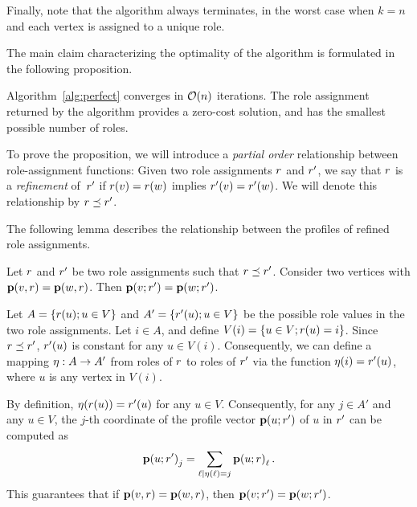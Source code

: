 Finally, note that the \algperfect algorithm always terminates, 
in the worst case when $k=n$ and each vertex is assigned to a unique role.

The main claim characterizing the optimality of the \algperfect algorithm
is formulated in the following proposition.

\begin{proposition}
\label{prop:perfectcorrect}
Algorithm~\ref{alg:perfect} converges in $\bigO{n}$ iterations. 
The role assignment returned by the algorithm  
provides a zero-cost solution, 
and has the smallest possible number of roles.
\end{proposition}

To prove the proposition, we will introduce a \emph{partial order} 
relationship between 
role-assignment functions:  
Given two role assignments $r$ and $r'$, we say that $r$ is a
\emph{refinement} of~$r'$ if $r(v) = r(w)$ implies $r'(v) =
r'(w)$. We will denote this relationship by $r \preceq r'$.

The following lemma describes the relationship between the profiles of refined role assignments.

\begin{lemma}
\label{lem:refineprofile}
Let $r$ and $r'$ be two role assignments such that $r \preceq r'$.
Consider two vertices %
with $\prof{v, \role} = \prof{w, \role}$. 
Then $\prof{v; \role'} = \prof{w; \role'}$.
\end{lemma}

\begin{IEEEproof}
Let $A = \left\{r(u); u \in V\right\}$ and $A' = \left\{r'(u); u \in V\right\}$ be the
possible role values in the two role assignments. 
Let $i \in A$, and define $V(i) = \left\{u \in V; r(u) = i\right\}$.
Since $r \preceq r'$, $r'(u)$ is constant for any $u \in V(i)$.
Consequently, we can define a mapping 
${\eta}:{A} \to {A'}$ 
from roles of $r$
to roles of $r'$ via the function
$\eta(i) = r'(u)$, where $u$ is any vertex in $V(i)$.

By definition, $\eta(r(u)) = r'(u)$ for any $u \in V$. 
Consequently,
for any $j \in A'$ and any $u \in V$, 
the $j$-th coordinate of the profile vector $\prof{u; \role'}$
of $u$ in $r'$ can be computed as  
\[
\prof{u; \role'}_j = \sum_{\ell\mid\eta(\ell) = j} \prof{u; \role}_\ell.
\]
This guarantees that if $\prof{v, \role} = \prof{w, \role}$, then $\prof{v; \role'} = \prof{w; \role'}$.
\end{IEEEproof}

